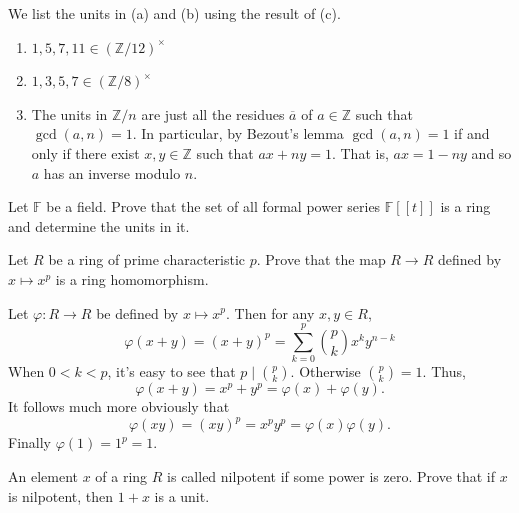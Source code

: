 \documentclass[12 pt, letterpaper]{hmcpset}
\begin{document}
\begin{solution}
	We list the units in (a) and (b) using the result of (c).
	\begin{enumerate}
		\item $1, 5, 7, 11 \in (\mathbb{Z} / 12)^{\times}$

		\item $1, 3, 5, 7 \in (\mathbb{Z} / 8)^{\times}$

		\item The units in $\mathbb{Z} / n$ are just all the residues $\overline{a}$ of $a \in \mathbb{Z}$ such that $\gcd(a, n) = 1$. In particular, by Bezout's lemma $\gcd(a, n) = 1$ if and only if there exist $x, y \in \mathbb{Z}$ such that $ax + ny = 1$. That is, $ax = 1 - ny$ and so $a$ has an inverse modulo $n$.
	\end{enumerate}
\end{solution}

\pagebreak

\begin{problem}[7.]
	Let $\mathbb{F}$ be a field. Prove that the set of all formal power series $\mathbb{F}[[t]]$ is a ring and determine the units in it.
\end{problem}

\pagebreak

\begin{problem}[8.]
	Let $R$ be a ring of prime characteristic $p$. Prove that the map $R \to R$ defined by $x \mapsto x^{p}$ is a ring homomorphism.
\end{problem}

\begin{solution}
	Let $\varphi : R \to R$ be defined by $x \mapsto x^{p}$. Then for any $x, y \in R$,
	\[
		\varphi(x + y) = (x + y)^{p} = \sum_{k = 0}^{p} \binom{p}{k} x^{k} y^{n - k}
	\]
	When $0 < k < p$, it's easy to see that $p \mid \binom{p}{k}$. Otherwise $\binom{p}{k} = 1$. Thus,
	\[
		\varphi(x + y) = x^{p} + y^{p} = \varphi(x) + \varphi(y).
	\]
	It follows much more obviously that
	\[
		\varphi(xy) = (xy)^{p} = x^{p} y^{p} = \varphi(x) \varphi(y).
	\]
	Finally $\varphi(1) = 1^{p} = 1$.
\end{solution}

\pagebreak

\begin{problem}[9.]
	An element $x$ of a ring $R$ is called nilpotent if some power is zero. Prove that if $x$ is nilpotent, then $1 + x$ is a unit.
\end{problem}
\end{document}
